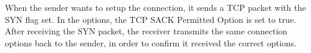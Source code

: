 When the sender wants to setup the connection, it sends a TCP packet with the SYN flag set. In the options, the TCP SACK Permitted Option is set to true. After receiving the SYN packet, the receiver transmits the same connection options back to the sender, in order to confirm it received the correct options.
